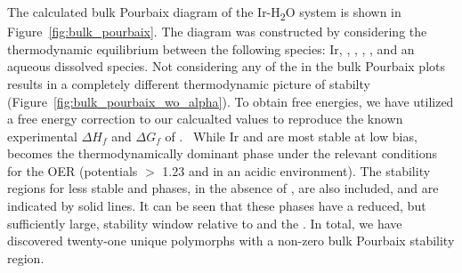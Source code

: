%
%
The calculated bulk Pourbaix diagram of the Ir-H\textsubscript{2}O system is shown in Figure~\ref{fig:bulk_pourbaix}.
%
The diagram was constructed by considering the thermodynamic equilibrium between the following species: Ir, \rIrOtwo, \aIrOthree, \rIrOthree, \bIrOthree, and an aqueous dissolved  species.
%
Not considering any of the \IrOthree in the bulk Pourbaix plots results in a completely different thermodynamic picture of \IrOtwo stabilty (Figure~\ref{fig:bulk_pourbaix_wo_alpha}).
%
To obtain free energies, we have utilized a free energy correction to our calcualted values to reproduce the known experimental $\Delta H_f$ and $\Delta G_f$ of \rIrOtwo.~\cite{Barin1995}
%
While Ir and \rIrOtwo are most stable at low bias, \aIrOthree becomes the thermodynamically dominant phase under the relevant conditions for the OER (potentials $>$ 1.23 \VRHE and in an acidic environment).
%
The stability regions for less stable \bIrOthree and \rIrOthree phases,
in the absence of \aIrOthree, are also included,
and are indicated by solid lines.
%
It can be seen that these phases have a reduced, but sufficiently large, stability window relative to \IrOtwo and the .
%
In total, we have discovered twenty-one unique \IrOthree polymorphs with a non-zero bulk Pourbaix stability region.
%


